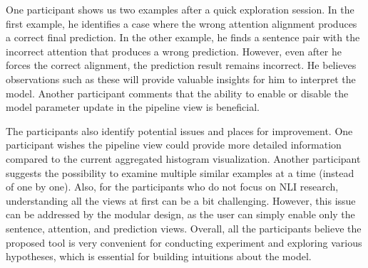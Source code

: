 One participant shows us two examples after a quick exploration session. 
In the first example, he identifies a case where the wrong attention alignment produces a correct final prediction.
%
In the other example, he finds a sentence pair with the incorrect attention that produces a wrong prediction. 
However, even after he forces the correct alignment, the prediction result remains incorrect. He believes observations such as these will provide valuable insights for him to interpret the model. 
%
Another participant comments that the ability to enable or disable the model parameter update in the pipeline view is beneficial.

The participants also identify potential issues and places for improvement. 
One participant wishes the pipeline view could provide more detailed information compared to the current aggregated histogram visualization. 
Another participant suggests the possibility to examine multiple similar examples at a time (instead of one by one). 
%
Also, for the participants who do not focus on NLI research, understanding all the views at first can be a bit challenging. However, this issue can be addressed by the modular design, as the user can simply enable only the sentence, attention, and prediction views.
%
Overall, all the participants believe the proposed tool is very convenient for conducting experiment and exploring various hypotheses, which is essential for building intuitions about the model.



